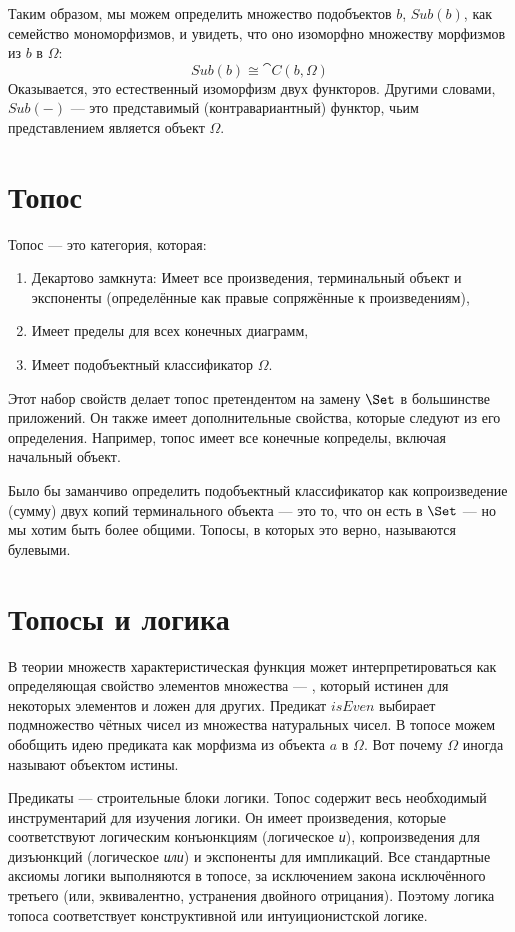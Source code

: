 Таким образом, мы можем определить множество подобъектов $b$, $\mathit{Sub}(b)$,
как семейство мономорфизмов, и увидеть, что оно изоморфно множеству
морфизмов из $b$ в $\Omega$:
\[\mathit{Sub}(b) \cong \cat{C}(b, \Omega)\]
Оказывается, это естественный изоморфизм двух функторов. Другими
словами, $\mathit{Sub}(-)$ — это представимый (контравариантный) функтор, чьим
представлением является объект $\Omega$.

\section{Топос}

Топос — это категория, которая:

\begin{enumerate}
  \tightlist
  \item
        Декартово замкнута: Имеет все произведения, терминальный объект и
        экспоненты (определённые как правые сопряжённые к произведениям),
  \item
        Имеет пределы для всех конечных диаграмм,
  \item
        Имеет подобъектный классификатор $\Omega$.
\end{enumerate}

Этот набор свойств делает топос претендентом на замену $\Set$ в большинстве
приложений. Он также имеет дополнительные свойства, которые следуют из его
определения. Например, топос имеет все конечные копределы, включая
начальный объект.

Было бы заманчиво определить подобъектный классификатор как копроизведение
(сумму) двух копий терминального объекта --- это то, что он есть в
$\Set$ --- но мы хотим быть более общими. Топосы, в которых
это верно, называются булевыми.

\section{Топосы и логика}

В теории множеств характеристическая функция может интерпретироваться как определяющая
свойство элементов множества --- , который истинен
для некоторых элементов и ложен для других. Предикат $\mathit{isEven}$
выбирает подмножество чётных чисел из множества натуральных чисел. В
топосе можем обобщить идею предиката как морфизма из
объекта $a$ в $\Omega$. Вот почему $\Omega$ иногда
называют объектом истины.

Предикаты — строительные блоки логики. Топос содержит весь
необходимый инструментарий для изучения логики. Он имеет произведения, которые
соответствуют логическим конъюнкциям (логическое \emph{и}), копроизведения для
дизъюнкций (логическое \emph{или}) и экспоненты для импликаций. Все
стандартные аксиомы логики выполняются в топосе, за исключением закона исключённого
третьего (или, эквивалентно, устранения двойного отрицания). Поэтому
логика топоса соответствует конструктивной или интуиционистской логике.

